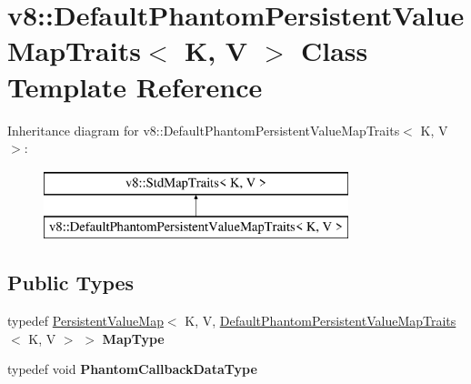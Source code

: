 \hypertarget{classv8_1_1_default_phantom_persistent_value_map_traits}{}\section{v8\+:\+:Default\+Phantom\+Persistent\+Value\+Map\+Traits$<$ K, V $>$ Class Template Reference}
\label{classv8_1_1_default_phantom_persistent_value_map_traits}
Inheritance diagram for v8\+:\+:Default\+Phantom\+Persistent\+Value\+Map\+Traits$<$ K, V $>$\+:\begin{figure}[H]
\begin{center}
\leavevmode
\includegraphics[height=2.000000cm]{classv8_1_1_default_phantom_persistent_value_map_traits}
\end{center}
\end{figure}
\subsection*{Public Types}
\begin{DoxyCompactItemize}
\item 
\hypertarget{classv8_1_1_default_phantom_persistent_value_map_traits_a15222621f1f4588cc075beff86ff46b0}{}typedef \hyperlink{classv8_1_1_persistent_value_map}{Persistent\+Value\+Map}$<$ K, V, \hyperlink{classv8_1_1_default_phantom_persistent_value_map_traits}{Default\+Phantom\+Persistent\+Value\+Map\+Traits}$<$ K, V $>$ $>$ {\bfseries Map\+Type}\label{classv8_1_1_default_phantom_persistent_value_map_traits_a15222621f1f4588cc075beff86ff46b0}

\item 
\hypertarget{classv8_1_1_default_phantom_persistent_value_map_traits_a7cd15202c39c874a71e42e0680408ed7}{}typedef void {\bfseries Phantom\+Callback\+Data\+Type}\label{classv8_1_1_default_phantom_persistent_value_map_traits_a7cd15202c39c874a71e42e0680408ed7}

\end{DoxyCompactItemize}
